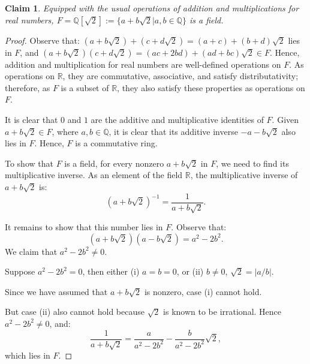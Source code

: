 \documentclass[a4paper,12pt]{report}
\newcommand{\abs}[1]{\left|#1\right|}
\newcounter{statement}
\numberwithin{statement}{chapter}
\newtheorem{claim}[statement]{Claim}
\numberwithin{equation}{chapter}
\numberwithin{section}{chapter}
\numberwithin{subsection}{section}
\begin{document}
\begin{claim}
Equipped with the usual operations of addition and multiplications for real numbers,
$F = \mathbb{Q}[\sqrt{2}] := \{a + b\sqrt{2}|a, b \in \mathbb{Q}\}$ is a field.
\end{claim}
\begin{proof}

Observe that:
$(a + b\sqrt{2}) + (c + d\sqrt{2}) = (a + c) + (b + d)\sqrt{2}$ lies in $F$,
and $(a + b\sqrt{2})(c + d\sqrt{2}) = (ac + 2bd) + (ad + bc)\sqrt{2} \in F$.
Hence, addition and multiplication for real numbers are well-defined operations on
$F$.
As operations on $\mathbb{R}$,
they are commutative, associative, and satisfy distributativity;
therefore, as $F$ is a subset of $\mathbb{R}$,
they also satisfy these properties as operations on $F$.





It is clear that $0$ and $1$
are the additive and multiplicative identities of $F$.
Given $a + b\sqrt{2} \in F$, where $a, b \in \mathbb{Q}$, it is clear that
its additive inverse $-a - b\sqrt{2}$ also lies in $F$.
Hence, $F$ is a commutative ring.





To show that $F$ is a field, for every nonzero $a + b \sqrt{2}$ in $F$, we need to find its multiplicative inverse.  As an element of the field $\mathbb{R}$, the multiplicative inverse of $a + b\sqrt{2}$ is:
\[
(a + b\sqrt{2})^{-1} = \frac{1}{a + b\sqrt{2}}.
\]

It remains to show that this number lies in $F$.
Observe that:
\[
(a + b\sqrt{2})(a - b\sqrt{2}) = a^2 - 2b^2.
\]
We claim that $a^2 - 2b^2 \neq 0$.


Suppose $a^2 - 2b^2 = 0$, then either (i) $a = b = 0$, or (ii) $b\neq 0$, $\sqrt{2} = \abs{a/b}$.


Since we have assumed that $a + b\sqrt{2}$ is nonzero, case (i) cannot hold.


But case (ii) also cannot hold because $\sqrt{2}$ is known to be irrational.
Hence $a^2 - 2b^2 \neq 0$, and:
\[
\frac{1}{a + b\sqrt{2}} = \frac{a}{a^2 - 2b^2} - \frac{b}{a^2 - 2b^2}\sqrt{2},
\]
which lies in $F$.


\end{proof}
\end{document}
